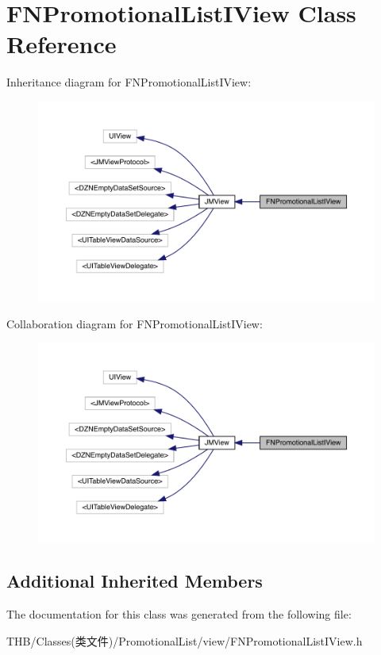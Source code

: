 \hypertarget{interface_f_n_promotional_list_i_view}{}\section{F\+N\+Promotional\+List\+I\+View Class Reference}
\label{interface_f_n_promotional_list_i_view}


Inheritance diagram for F\+N\+Promotional\+List\+I\+View\+:\nopagebreak
\begin{figure}[H]
\begin{center}
\leavevmode
\includegraphics[width=350pt]{interface_f_n_promotional_list_i_view__inherit__graph}
\end{center}
\end{figure}


Collaboration diagram for F\+N\+Promotional\+List\+I\+View\+:\nopagebreak
\begin{figure}[H]
\begin{center}
\leavevmode
\includegraphics[width=350pt]{interface_f_n_promotional_list_i_view__coll__graph}
\end{center}
\end{figure}
\subsection*{Additional Inherited Members}


The documentation for this class was generated from the following file\+:\begin{DoxyCompactItemize}
\item 
T\+H\+B/\+Classes(类文件)/\+Promotional\+List/view/F\+N\+Promotional\+List\+I\+View.\+h\end{DoxyCompactItemize}
